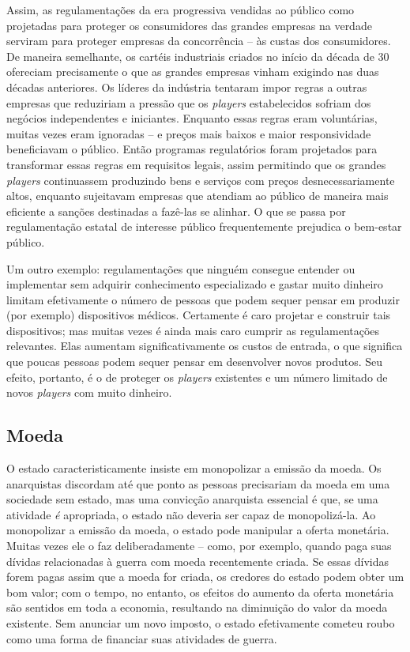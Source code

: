 Assim, as regulamentações da era progressiva vendidas ao público como projetadas para proteger os consumidores das grandes empresas na verdade serviram para proteger empresas da concorrência -- às custas dos consumidores. De maneira semelhante, os cartéis industriais criados no início da década de 30 ofereciam precisamente o que as grandes empresas vinham exigindo nas duas décadas anteriores. Os líderes da indústria tentaram impor regras a outras empresas que reduziriam a pressão que os \emph{players} estabelecidos sofriam dos negócios independentes e iniciantes. Enquanto essas regras eram voluntárias, muitas vezes eram ignoradas -- e preços mais baixos e maior responsividade beneficiavam o público. Então programas regulatórios foram projetados para transformar essas regras em requisitos legais, assim permitindo que os grandes \emph{players} continuassem produzindo bens e serviços com preços desnecessariamente altos, enquanto sujeitavam empresas que atendiam ao público de maneira mais eficiente a sanções destinadas a fazê-las se alinhar. O que se passa por regulamentação estatal de interesse público frequentemente prejudica o bem-estar público.

Um outro exemplo: regulamentações que ninguém consegue entender ou implementar sem adquirir conhecimento especializado e gastar muito dinheiro limitam efetivamente o número de pessoas que podem sequer pensar em produzir (por exemplo) dispositivos médicos. Certamente é caro projetar e construir tais dispositivos; mas muitas vezes é ainda mais caro cumprir as regulamentações relevantes. Elas aumentam significativamente os custos de entrada, o que significa que poucas pessoas podem sequer pensar em desenvolver novos produtos. Seu efeito, portanto, é o de proteger os \emph{players} existentes e um número limitado de novos \emph{players} com muito dinheiro.

\subsection*{Moeda}

O estado caracteristicamente insiste em monopolizar a emissão da moeda. Os anarquistas discordam até que ponto as pessoas precisariam da moeda em uma sociedade sem estado, mas uma convicção anarquista essencial é que, se uma atividade \emph{é} apropriada, o estado não deveria ser capaz de monopolizá-la. Ao monopolizar a emissão da moeda, o estado pode manipular a oferta monetária. Muitas vezes ele o faz deliberadamente -- como, por exemplo, quando paga suas dívidas relacionadas à guerra com moeda recentemente criada. Se essas dívidas forem pagas assim que a moeda for criada, os credores do estado podem obter um bom valor; com o tempo, no entanto, os efeitos do aumento da oferta monetária são sentidos em toda a economia, resultando na diminuição do valor da moeda existente. Sem anunciar um novo imposto, o estado efetivamente cometeu roubo como uma forma de financiar suas atividades de guerra.

